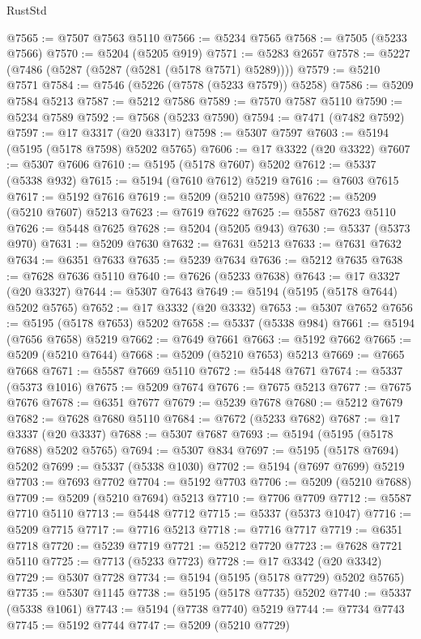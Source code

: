 \begin{lexlean}{RustStd}
\begin{coremodule}
@7565 := @7507 @7563 @5110
@7566 := @5234 @7565
@7568 := @7505 (@5233 @7566)
@7570 := @5204 (@5205 @919)
@7571 := @5283 @2657
@7578 := @5227 (@7486 (@5287 (@5287 (@5281 (@5178 @7571) @5289))))
@7579 := @5210 @7571
@7584 := @7546 (@5226 (@7578 (@5233 @7579)) @5258)
@7586 := @5209 @7584 @5213
@7587 := @5212 @7586
@7589 := @7570 @7587 @5110
@7590 := @5234 @7589
@7592 := @7568 (@5233 @7590)
@7594 := @7471 (@7482 @7592)
@7597 := @17 @3317 (@20 @3317)
@7598 := @5307 @7597
@7603 := @5194 (@5195 (@5178 @7598) @5202 @5765)
@7606 := @17 @3322 (@20 @3322)
@7607 := @5307 @7606
@7610 := @5195 (@5178 @7607) @5202
@7612 := @5337 (@5338 @932)
@7615 := @5194 (@7610 @7612) @5219
@7616 := @7603 @7615
@7617 := @5192 @7616
@7619 := @5209 (@5210 @7598)
@7622 := @5209 (@5210 @7607) @5213
@7623 := @7619 @7622
@7625 := @5587 @7623 @5110
@7626 := @5448 @7625
@7628 := @5204 (@5205 @943)
@7630 := @5337 (@5373 @970)
@7631 := @5209 @7630
@7632 := @7631 @5213
@7633 := @7631 @7632
@7634 := @6351 @7633
@7635 := @5239 @7634
@7636 := @5212 @7635
@7638 := @7628 @7636 @5110
@7640 := @7626 (@5233 @7638)
@7643 := @17 @3327 (@20 @3327)
@7644 := @5307 @7643
@7649 := @5194 (@5195 (@5178 @7644) @5202 @5765)
@7652 := @17 @3332 (@20 @3332)
@7653 := @5307 @7652
@7656 := @5195 (@5178 @7653) @5202
@7658 := @5337 (@5338 @984)
@7661 := @5194 (@7656 @7658) @5219
@7662 := @7649 @7661
@7663 := @5192 @7662
@7665 := @5209 (@5210 @7644)
@7668 := @5209 (@5210 @7653) @5213
@7669 := @7665 @7668
@7671 := @5587 @7669 @5110
@7672 := @5448 @7671
@7674 := @5337 (@5373 @1016)
@7675 := @5209 @7674
@7676 := @7675 @5213
@7677 := @7675 @7676
@7678 := @6351 @7677
@7679 := @5239 @7678
@7680 := @5212 @7679
@7682 := @7628 @7680 @5110
@7684 := @7672 (@5233 @7682)
@7687 := @17 @3337 (@20 @3337)
@7688 := @5307 @7687
@7693 := @5194 (@5195 (@5178 @7688) @5202 @5765)
@7694 := @5307 @834
@7697 := @5195 (@5178 @7694) @5202
@7699 := @5337 (@5338 @1030)
@7702 := @5194 (@7697 @7699) @5219
@7703 := @7693 @7702
@7704 := @5192 @7703
@7706 := @5209 (@5210 @7688)
@7709 := @5209 (@5210 @7694) @5213
@7710 := @7706 @7709
@7712 := @5587 @7710 @5110
@7713 := @5448 @7712
@7715 := @5337 (@5373 @1047)
@7716 := @5209 @7715
@7717 := @7716 @5213
@7718 := @7716 @7717
@7719 := @6351 @7718
@7720 := @5239 @7719
@7721 := @5212 @7720
@7723 := @7628 @7721 @5110
@7725 := @7713 (@5233 @7723)
@7728 := @17 @3342 (@20 @3342)
@7729 := @5307 @7728
@7734 := @5194 (@5195 (@5178 @7729) @5202 @5765)
@7735 := @5307 @1145
@7738 := @5195 (@5178 @7735) @5202
@7740 := @5337 (@5338 @1061)
@7743 := @5194 (@7738 @7740) @5219
@7744 := @7734 @7743
@7745 := @5192 @7744
@7747 := @5209 (@5210 @7729)

\end{coremodule}
\end{lexlean}
